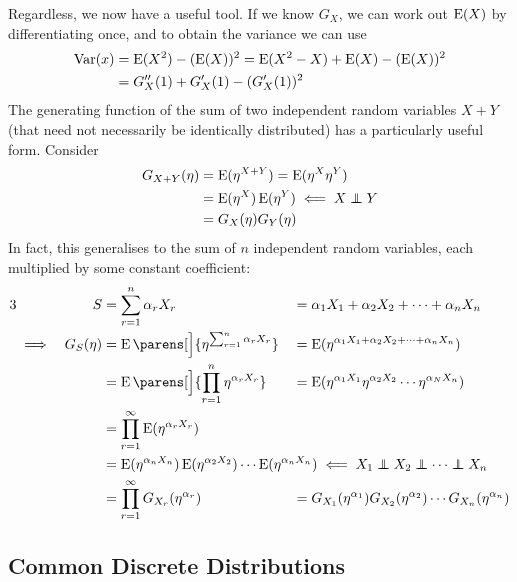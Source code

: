 Regardless, we now have a useful tool. If we know \(G_X\), we can work out
\(\operatorname{E}(X)\) by differentiating once, and to obtain the variance we can use
\begin{align*}
\operatorname{Var}(x) &= \operatorname{E}(X^2) - (\operatorname{E}(X))^2
    = \operatorname{E}(X^2 - X) + \operatorname{E}(X) - (\operatorname{E}(X))^2 \\
    &= G_X''(1) + G_X'(1) - (G_X'(1))^2
\end{align*}
The generating function of the sum of two independent random variables \(X + Y\)
(that need not necessarily be identically distributed) has a particularly useful
form. Consider
\begin{align*}
G_{X+Y}(\eta) &= \Expect(\eta^{X + Y}) = \Expect(\eta^X \eta^Y) \\
    &= \Expect(\eta^X) \Expect(\eta^Y) \impliedby X \independent Y \\
    &= G_X(\eta) G_Y(\eta)
\end{align*}
In fact, this generalises to the sum of \(n\) independent random variables, each
multiplied by some constant coefficient:
\begin{alignat*} 3
&& S &= \sum_{r = 1}^n \alpha_r X_r
    &&= \alpha_1 X_1 + \alpha_2 X_2 + \dotsb + \alpha_n X_n \\
    &\implies& G_S(\eta) &= \Expect\parens[\Big]{\eta^{\sum_{r = 1}^n \alpha_r X_r}}
    &&= \Expect(\eta^{\alpha_1 X_1 + \alpha_2 X_2 + \dotsb + \alpha_n X_n}) \\
    && &= \Expect\parens[\Big]{\prod_{r = 1}^n \eta^{\alpha_r X_r}}
    &&= \Expect(\eta^{\alpha_1 X_1} \eta^{\alpha_2 X_2} \dotsm
              \eta^{\alpha_N X_n}) \\
&& &= \prod_{r = 1}^\infty\Expect(\eta^{\alpha_r X_r}) \\
&& &= \mathrlap{
        \Expect(\eta^{\alpha_n X_n}) \Expect(\eta^{\alpha_2 X_2}) \dotsm
        \Expect(\eta^{\alpha_n X_n})
            \impliedby X_1 \independent X_2 \independent
                             \dotsb \independent X_n} \\
&& &= \prod_{r = 1}^\infty G_{X_r}(\eta^{\alpha_r})
    &&= G_{X_1}(\eta^{\alpha_1}) G_{X_2}(\eta^{\alpha_2}) \dotsm
        G_{X_n}(\eta^{\alpha_n})
\end{alignat*}

\subsection{Common Discrete Distributions}

